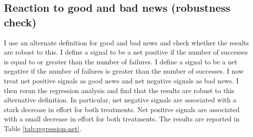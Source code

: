 \documentclass[
  12pt,
]{article}
\begin{document}
\hypertarget{reaction-to-good-and-bad-news-robustness-check}{%
\subsection{Reaction to good and bad news (robustness
check)}\label{reaction-to-good-and-bad-news-robustness-check}}

I use an alternate definition for good and bad news and check whether
the results are robust to this. I define a signal to be a net positive
if the number of successes is equal to or greater than the number of
failures. I define a signal to be a net negative if the number of
failures is greater than the number of successes. I now treat net
positive signals as good news and net negative signals as bad news. I
then rerun the regression analysis and find that the results are robust
to this alternative definition. In particular, net negative signals are
associated with a stark decrease in effort for both treatments. Net
positive signals are associated with a small decrease in effort for both
treatments. The results are reported in Table \ref{tab:regression-net}.
\end{document}
